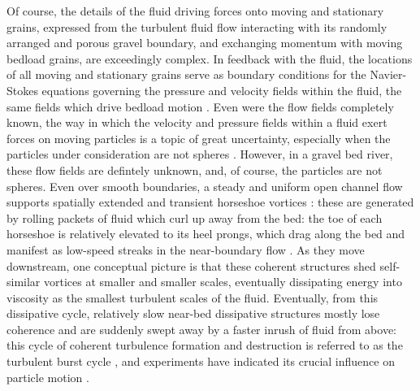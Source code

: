 \documentclass{article}
\begin{document}
Of course, the details of the fluid driving forces onto moving and stationary grains, expressed from the turbulent fluid flow interacting with its randomly arranged and porous gravel boundary, and exchanging momentum with moving bedload grains, are exceedingly complex. 
In feedback with the fluid, the locations of all moving and stationary grains serve as boundary conditions for the Navier-Stokes equations governing the pressure and velocity fields within the fluid, the same fields which drive bedload motion \citep{Nikora2013}.
Even were the flow fields completely known, the way in which the velocity and pressure fields within a fluid exert forces on moving particles is a topic of great uncertainty, especially when the particles under consideration are not spheres \citep{Maxey1983}.
However, in a gravel bed river, these flow fields are defintely unknown, and, of course, the particles are not spheres.  
Even over smooth boundaries, a steady and uniform open channel flow supports spatially extended and transient horseshoe vortices \citep{Adrian2007}: these are generated by rolling packets of fluid which curl up away from the bed: the toe of each horseshoe is relatively elevated to its heel prongs, which drag along the bed and manifest as low-speed streaks in the near-boundary flow \citep{Klein1967, Nino1998}. 
As they move downstream, one conceptual picture is that these coherent structures shed self-similar vortices at smaller and smaller scales, eventually dissipating energy into viscosity as the smallest turbulent scales of the fluid. 
Eventually, from this dissipative cycle, relatively slow near-bed dissipative structures mostly lose coherence and are suddenly swept away by a faster inrush of fluid from above: this cycle of coherent turbulence formation and destruction is referred to as the turbulent burst cycle \citep{}, and experiments have indicated its crucial influence on particle motion \citep{Nino1998, Amir2017}. 
\end{document}
